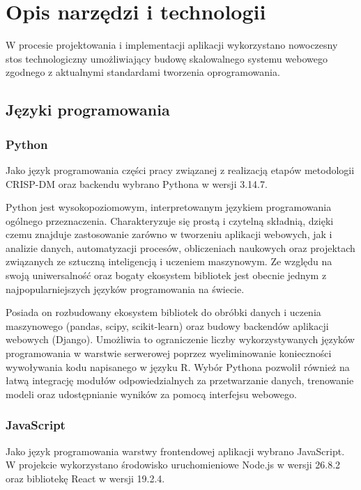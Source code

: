 \documentclass[12pt]{book}
\begin{document}
\chapter{Opis narzędzi i technologii}

W procesie projektowania i implementacji aplikacji wykorzystano nowoczesny stos technologiczny umożliwiający
budowę skalowalnego systemu webowego zgodnego z aktualnymi standardami tworzenia oprogramowania.

\section{Języki programowania}

\subsection{Python}

	Jako język programowania części pracy związanej z realizacją etapów metodologii CRISP-DM oraz backendu wybrano Pythona w wersji 3.14.7.

	Python jest wysokopoziomowym, interpretowanym językiem programowania ogólnego przeznaczenia.
Charakteryzuje się prostą i czytelną składnią, dzięki czemu znajduje zastosowanie zarówno w tworzeniu aplikacji webowych,
jak i analizie danych, automatyzacji procesów, obliczeniach naukowych oraz projektach związanych ze sztuczną inteligencją i uczeniem maszynowym.
Ze względu na swoją uniwersalność oraz bogaty ekosystem bibliotek jest obecnie jednym z najpopularniejszych języków programowania na świecie.

	Posiada on rozbudowany ekosystem bibliotek do obróbki danych i uczenia maszynowego (pandas, scipy, scikit-learn) oraz budowy backendów aplikacji webowych (Django).
Umożliwia to ograniczenie liczby wykorzystywanych języków programowania w warstwie serwerowej poprzez wyeliminowanie konieczności wywoływania kodu napisanego w języku R.
Wybór Pythona pozwolił również na łatwą integrację modułów odpowiedzialnych za przetwarzanie danych, trenowanie modeli oraz udostępnianie wyników za pomocą interfejsu webowego.

\subsection{JavaScript}

	Jako język programowania warstwy frontendowej aplikacji wybrano JavaScript.
W projekcie wykorzystano środowisko uruchomieniowe Node.js w wersji 26.8.2 oraz bibliotekę React w wersji 19.2.4.
\end{document}
